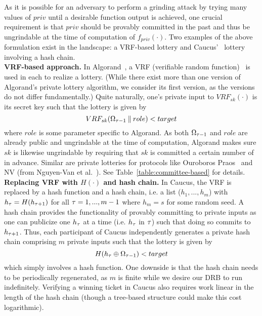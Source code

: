 As it is possible for an adversary to perform a grinding attack by trying many values of $priv$ until a desirable function output is achieved, one crucial requirement is that $priv$ should be provably committed in the past and thus be ungrindable at the time of computation of $f_{priv}(\cdot)$. Two examples of the above formulation exist in the landscape: a VRF-based lottery and Caucus'~\cite{azouvi2018winning} lottery involving a hash chain.\\

\noindent\textbf{VRF-based approach.} In Algorand~\cite{gilad2017algorand}, a VRF (verifiable random function)~\cite{micali1999verifiable,dodis2005verifiable} is used in each \epoch to realize a lottery. (While there exist more than one version of Algorand's private lottery algorithm, we consider its first version, as the versions do not differ fundamentally.) Quite naturally, one's private input to $VRF_{sk}(\cdot)$ is its secret key such that the lottery is given by
\[
VRF_{sk}(\Omega_{\tau - 1} \mathbin\Vert role) < target
\]
where $role$ is some parameter specific to Algorand. As both $\Omega_{\tau - 1}$ and $role$ are already public and ungrindable at the time of computation, Algorand makes sure $sk$ is likewise ungrindable by requiring that $sk$ is committed a certain number of \epochs in advance. Similar are private lotteries for protocols like Ouroboros Praos~\cite{david2018ouroboros} and NV (from Nguyen-Van et al.~\cite{nguyen2019scalable}). See Table~\ref{table:committee-based} for details.\\

\noindent\textbf{Replacing VRF with $H(\cdot)$ and hash chain.} In Caucus, the VRF is replaced by a hash function and a hash chain, i.e. a list ($h_1, ..., h_m$) with $h_\tau = H(h_{\tau + 1})$ for all $\tau = 1, ..., m - 1$ where $h_m = s$ for some random seed. A hash chain provides the functionality of provably committing to private inputs as one can publicize one $h_\tau$ at a time (i.e. $h_\tau$ in \epoch $\tau$) such that doing so commits to $h_{\tau + 1}$. Thus, each participant of Caucus independently generates a private hash chain comprising $m$ private inputs such that the lottery is given by
\[
H(h_\tau \oplus \Omega_{\tau - 1}) < target
\]
which simply involves a hash function. One downside is that the hash chain needs to be periodically regenerated, as $m$ is finite while we desire our DRB to run indefinitely. Verifying a winning ticket in Caucus also requires work linear in the length of the hash chain (though a tree-based structure could make this cost logarithmic).\\

